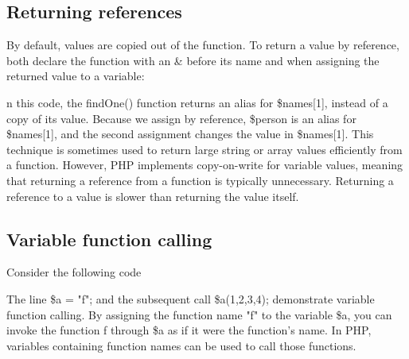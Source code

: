 \documentclass{report}
\begin{document}
\bigbreak \noindent 
\subsection{Returning references}
\bigbreak \noindent 
By default, values are copied out of the function. To return a value by reference, both
declare the function with an \& before its name and when assigning the returned value
to a variable:
\bigbreak \noindent 
{}
\bigbreak \noindent 
n this code, the findOne() function returns an alias for \$names[1], instead of a copy of
its value. Because we assign by reference, \$person is an alias for \$names[1], and the
second assignment changes the value in \$names[1].
\bigbreak \noindent 
This technique is sometimes used to return large string or array values efficiently from
a function. However, PHP implements copy-on-write for variable values, meaning that
returning a reference from a function is typically unnecessary. Returning a reference to
a value is slower than returning the value itself.

\bigbreak \noindent 
\subsection{Variable function calling}
\bigbreak \noindent 
Consider the following code
\bigbreak \noindent 
{}
\bigbreak \noindent 
The line \$a = "f"; and the subsequent call \$a(1,2,3,4); demonstrate variable function calling. By assigning the function name "f" to the variable \$a, you can invoke the function f through \$a as if it were the function’s name. In PHP, variables containing function names can be used to call those functions.

\pagebreak 
\end{document}
